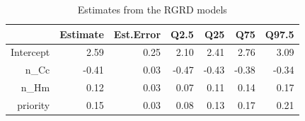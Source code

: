 \documentclass{article}\usepackage[]{graphicx}\usepackage[]{color}
\begin{document}
\begin{table}[ht]
\centering
\begin{tabular}{rrrrrrr}
  \hline
 & Estimate & Est.Error & Q2.5 & Q25 & Q75 & Q97.5 \\ 
  \hline
Intercept & 2.59 & 0.25 & 2.10 & 2.41 & 2.76 & 3.09 \\ 
  n\_Cc & -0.41 & 0.03 & -0.47 & -0.43 & -0.38 & -0.34 \\ 
  n\_Hm & 0.12 & 0.03 & 0.07 & 0.11 & 0.14 & 0.17 \\ 
  priority & 0.15 & 0.03 & 0.08 & 0.13 & 0.17 & 0.21 \\ 
   \hline
\end{tabular}
\caption{Estimates from the RGRD models}
\label{tab:RGRD}
\end{table}
\end{document}
